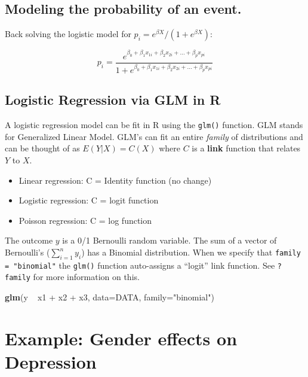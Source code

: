 \documentclass[]{article}
\newenvironment{Shaded}{\begin{snugshade}}{\end{snugshade}}
\newcommand{\KeywordTok}[1]{\textcolor[rgb]{0.13,0.29,0.53}{\textbf{{#1}}}}
\newcommand{\DataTypeTok}[1]{\textcolor[rgb]{0.13,0.29,0.53}{{#1}}}
\newcommand{\StringTok}[1]{\textcolor[rgb]{0.31,0.60,0.02}{{#1}}}
\newcommand{\NormalTok}[1]{{#1}}
\begin{document}
\subsection{Modeling the probability of an
event.}\label{modeling-the-probability-of-an-event.}

Back solving the logistic model for
\(p_{i} = e^{\beta X} / (1+e^{\beta X})\):

\[
p_{i} = \frac{e^{\beta_{0} + \beta_{1}x_{1i} + \beta_{2}x_{2i} + \ldots + \beta_{p}x_{pi}}}
{1 + e^{\beta_{0} + \beta_{1}x_{1i} + \beta_{2}x_{2i} + \ldots + \beta_{p}x_{pi}}}
\]

\subsection{Logistic Regression via GLM in
R}\label{logistic-regression-via-glm-in-r}

A logistic regression model can be fit in R using the \texttt{glm()}
function. GLM stands for Generalized Linear Model. GLM's can fit an
entire \emph{family} of distributions and can be thought of as
\(E(Y|X) = C(X)\) where \(C\) is a \textbf{link} function that relates
\(Y\) to \(X\).

\begin{itemize}
\itemsep1pt\parskip0pt
\item
  Linear regression: C = Identity function (no change)
\item
  Logistic regression: C = logit function
\item
  Poisson regression: C = log function
\end{itemize}

The outcome \(y\) is a 0/1 Bernoulli random variable. The sum of a
vector of Bernoulli's (\(\sum_{i=1}^{n}y_{i}\)) has a Binomial
distribution. When we specify that \texttt{family = "binomial"} the
\texttt{glm()} function auto-assigns a ``logit'' link function. See
\texttt{?family} for more information on this.

\begin{Shaded}
\begin{Highlighting}[]
\KeywordTok{glm}\NormalTok{(y ~}\StringTok{ }\NormalTok{x1 +}\StringTok{ }\NormalTok{x2 +}\StringTok{ }\NormalTok{x3, }\DataTypeTok{data=}\NormalTok{DATA, }\DataTypeTok{family=}\StringTok{"binomial"}\NormalTok{)}
\end{Highlighting}
\end{Shaded}

\section{Example: Gender effects on
Depression}\label{example-gender-effects-on-depression}
\end{document}
